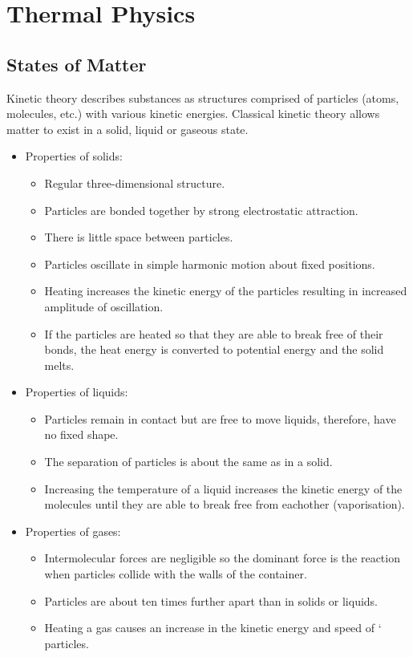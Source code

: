 \documentclass[a4,8pt]{article}
\begin{document}
\section{Thermal Physics}
\subsection{States of Matter}
Kinetic theory describes substances as structures comprised of particles (atoms, 
molecules, etc.) with various kinetic energies. Classical kinetic theory allows 
matter to exist in a solid, liquid or gaseous state.

\begin{itemize}
	\item Properties of solids:
		\begin{itemize}
			\item Regular three-dimensional structure.
			\item Particles are bonded together by strong electrostatic attraction.
			\item There is little space between particles.
			\item Particles oscillate in simple harmonic motion about fixed positions.
			\item Heating increases the kinetic energy of the particles resulting in 
            increased amplitude of oscillation.
			\item If the particles are heated so that they are able to break free of their 
            bonds, the heat energy is converted to potential energy and the solid melts.
		\end{itemize}
	\item Properties of liquids:
		\begin{itemize}
			\item Particles remain in contact but are free to move liquids, therefore, have 
            no fixed shape.
			\item The separation of particles is about the same as in a solid.
			\item Increasing the temperature of a liquid increases the kinetic energy of the 
            molecules until they are able to break free from eachother (vaporisation).
		\end{itemize}
	\item Properties of gases:
		\begin{itemize}
			\item Intermolecular forces are negligible so the dominant force is the reaction 
            when particles collide with the walls of the container.
			\item Particles are about ten times further apart than in solids or liquids.
			\item Heating a gas causes an increase in the kinetic energy and speed of 
`           particles.
		\end{itemize}
\end{itemize}
\end{document}

